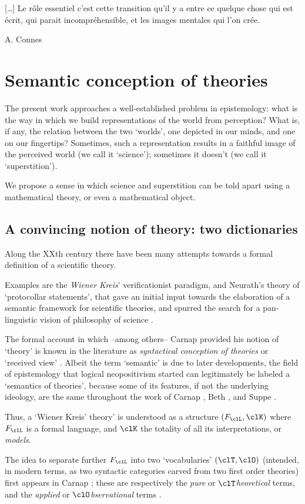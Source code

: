 \epigraph{[\dots\unkern] Le rôle essentiel c'est cette transition qu'il y a entre ce quelque chose qui est écrit, qui parait incompréhensible, et les images mentales qui l'on crée.}{A. Connes}
\section{Semantic conception of theories}\label{sec_1_intro}
The present work approaches a well-established problem in epistemology: what is the way in which we build representations of the world from perception? What is, if any, the relation between the two `worlds', one depicted in our minds, and one on our fingertips? Sometimes, such a representation results in a faithful image of the perceived world (we call it `science'); sometimes it doesn't (we call it `superstition').

We propose a sense in which science and superstition can be told apart using a mathematical theory, or even a mathematical object.
\subsection{A convincing notion of theory: two dictionaries}
Along the XXth century there have been many attempts towards a formal definition of a scientific theory.

Examples are the \emph{Wiener Kreis}' verificationist paradigm, and Neurath's theory of `protocollar statements', that gave an initial input towards the elaboration of a semantic framework for scientific theories, and spurred the search for a pan-linguistic vision of philosophy of science \cite{Weinb}.

The formal account in which --among others-- Carnap \cite{carnapfound} provided his notion of `theory' is known in the literature as \emph{syntactical conception of theories} or `received view' \cite{krause-foundation,krause2011axiomatization,giunti2016}. Albeit the term `semantic' is due to later developments, the field of epistemology that logical neopositivism started can legitimately be labeled a `semantics of theories', because some of its features, if not the underlying ideology, are the same throughout the work of Carnap \cite{carnap56,carnapfound},  Beth \cite{?}, and Suppe \cite{suppe89}.

Thus, a `Wiener Kreis' theory' is understood as a structure $(F_\clL, \clK)$ where $F_\clL$ is a formal language, and $\clK$ the totality of all its interpretations, or \emph{models}.

The idea to separate further $F_\clL$ into two `vocabularies' $(\clT,\clO)$ (intended, in modern terms, as two syntactic categories carved from two first order theories) first appears in Carnap \cite{}; these are respectively the \emph{pure} or $\clT$\emph{heoretical} terms, and the \emph{applied} or $\clO$\emph{bservational} terms \cite{refs_on_erkennen}.

